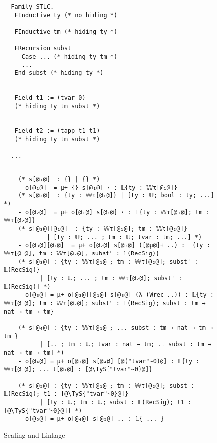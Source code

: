 \begin{figure}[!htb]
  
  \begin{minipage}{\textwidth}
  \begin{multicols}{3}
  

  
  \begin{lstlisting}
  Family STLC. 
   FInductive ty (* no hiding *)

   FInductive tm (* hiding ty *) 
   
   FRecursion subst
     Case ... (* hiding ty tm *)
     ...
   End subst (* hiding ty *) 
   

   Field t1 := (tvar 0) 
   (* hiding ty tm subst *) 


   Field t2 := (tapp t1 t1)
   (* hiding ty tm subst *)

  ...
  \end{lstlisting}
  
  
  \columnbreak
  
  \begin{lstlisting}

    (* s[@₁@]  : {} | {} *)
    - o[@₁@]  = μ+ {} s[@₁@] ⋆ : 𝕃{ty : 𝕎τ[@₁@]}
    (* s[@₂@]  : {ty : 𝕎τ[@₁@]} | [ty : 𝕌; bool : ty; ...] *) 
    - o[@₂@]  = μ+ o[@₁@] s[@₂@] ⋆ : 𝕃{ty : 𝕎τ[@₁@]; tm : 𝕎τ[@₂@]}
    (* s[@₃@][@₁@]  : {ty : 𝕎τ[@₁@]; tm : 𝕎τ[@₂@]}
            | [ty : 𝕌; ... ; tm : 𝕌; tvar : tm; ...] *)
    - o[@₃@][@₁@]  = μ+ o[@₂@] s[@₃@] ([@μ@]+ ..) : 𝕃{ty : 𝕎τ[@₁@]; tm : 𝕎τ[@₂@]; subst' : 𝕃(RecSig)}
    (* s[@₃@] : {ty : 𝕎τ[@₁@]; tm : 𝕎τ[@₂@]; subst' : 𝕃(RecSig)} 
          | [ty : 𝕌; ... ; tm : 𝕎τ[@₂@]; subst' : 𝕃(RecSig)] *)
    - o[@₃@] = μ+ o[@₃@][@₁@] s[@₃@] (λ (Wrec ..)) : 𝕃{ty : 𝕎τ[@₁@]; tm : 𝕎τ[@₂@]; subst' : 𝕃(RecSig); subst : tm → nat → tm → tm}
    
    (* s[@₄@] : {ty : 𝕎τ[@₁@]; ... subst : tm → nat → tm → tm } 
          | [.. ; tm : 𝕌; tvar : nat → tm; .. subst : tm → nat → tm → tm] *)
    - o[@₄@] = μ+ o[@₃@] s[@₄@] [@("tvar"~0)@] : 𝕃{ty : 𝕎τ[@₁@]; ... t[@₁@] : [@\TyS{"tvar"~0}@]}
  
    (* s[@₅@] : {ty : 𝕎τ[@₁@]; tm : 𝕎τ[@₂@]; subst : 𝕃(RecSig); t1 : [@\TyS{"tvar"~0}@]} 
          | [ty : 𝕌; tm : 𝕌; subst : 𝕃(RecSig); t1 : [@\TyS{"tvar"~0}@]] *)
    - o[@₅@] = μ+ o[@₄@] s[@₅@] .. : 𝕃{ ... }
  \end{lstlisting}
  
  \columnbreak
  

  
  \end{multicols}
  \end{minipage}
  \caption{Sealing and Linkage}\label{fig:sealing+linkage}
  \end{figure}

